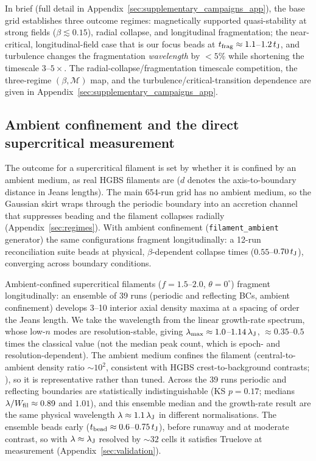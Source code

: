 \documentclass[usenatbib,twoside,twocolumn]{mnras}
\begin{document}
In brief (full detail in Appendix~\ref{sec:supplementary_campaigns_app}), the base grid establishes three outcome regimes: magnetically supported quasi-stability at strong fields ($\beta\lesssim0.15$), radial collapse, and longitudinal fragmentation; the near-critical, longitudinal-field case that is our focus beads at $t_{\rm frag}\approx1.1$--$1.2\,t_{\rm J}$, and turbulence changes the fragmentation \emph{wavelength} by $<5\%$ while shortening the timescale $3$--$5\times$. The radial-collapse/fragmentation timescale competition, the three-regime $(\beta,\mathcal{M})$ map, and the turbulence/critical-transition dependence are given in Appendix~\ref{sec:supplementary_campaigns_app}.


\subsection{Ambient confinement and the direct supercritical measurement}
\label{sec:modecompetition}

The outcome for a supercritical filament is set by whether it is confined by an ambient medium, as real HGBS filaments are ($d$ denotes the axis-to-boundary distance in Jeans lengths). The main 654-run grid has no ambient medium, so the Gaussian skirt wraps through the periodic boundary into an accretion channel that suppresses beading and the filament collapses radially (Appendix~\ref{sec:regimes}). With ambient confinement (\texttt{filament\_ambient} generator) the same configurations fragment longitudinally: a 12-run reconciliation suite beads at physical, $\beta$-dependent collapse times ($0.55$--$0.70\,t_{\rm J}$), converging across boundary conditions.

Ambient-confined supercritical filaments ($f=1.5$--$2.0$, $\theta=0^\circ$) fragment longitudinally: an ensemble of 39 runs (periodic and reflecting BCs, ambient confinement) develops 3--10 interior axial density maxima at a spacing of order the Jeans length. We take the wavelength from the linear growth-rate spectrum, whose low-$n$ modes are resolution-stable, giving $\lambda_{\rm max}\approx1.0$--$1.14\,\lambda_{\rm J}$, $\approx0.35$--$0.5$ times the classical value (not the median peak count, which is epoch- and resolution-dependent). The ambient medium confines the filament (central-to-ambient density ratio $\sim10^2$, consistent with HGBS crest-to-background contrasts; \citealt{Arzoumanian2019}), so it is representative rather than tuned. Across the 39 runs periodic and reflecting boundaries are statistically indistinguishable (KS $p=0.17$; medians $\lambda/W_{\rm fil}\approx0.89$ and $1.01$), and this ensemble median and the growth-rate result are the same physical wavelength $\lambda\approx1.1\,\lambda_{\rm J}$ in different normalisations. The ensemble beads early ($t_{\rm bead}\approx0.6$--$0.75\,t_{\rm J}$), before runaway and at moderate contrast, so with $\lambda\approx\lambda_{\rm J}$ resolved by ${\sim}32$ cells it satisfies Truelove at measurement (Appendix~\ref{sec:validation}).
\end{document}
